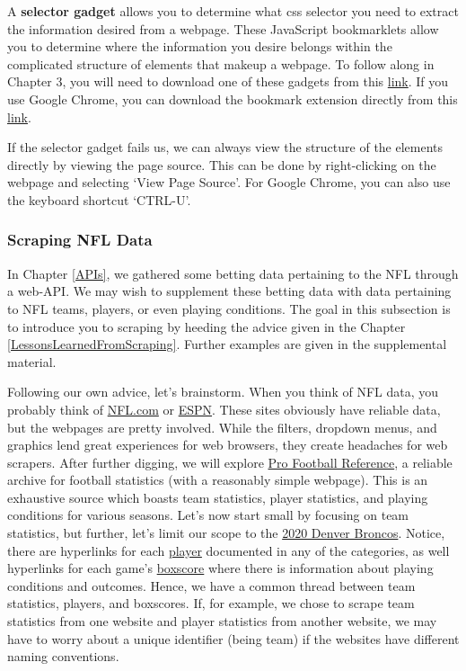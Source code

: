 \documentclass[
]{article}
\begin{document}
A \textbf{selector gadget} allows you to determine what css selector you need to extract the information desired from a webpage. These JavaScript bookmarklets allow you to determine where the information you desire belongs within the complicated structure of elements that makeup a webpage. To follow along in Chapter 3, you will need to download one of these gadgets from this \href{https://selectorgadget.com/}{link}. If you use Google Chrome, you can download the bookmark extension directly from this \href{https://selectorgadget.com/}{link}.

If the selector gadget fails us, we can always view the structure of the elements directly by viewing the page source. This can be done by right-clicking on the webpage and selecting `View Page Source'. For Google Chrome, you can also use the keyboard shortcut `CTRL-U'.

\hypertarget{scraping-nfl-data}{%
\subsubsection{Scraping NFL Data}\label{scraping-nfl-data}}

In Chapter \ref{APIs}, we gathered some betting data pertaining to the NFL through a web-API. We may wish to supplement these betting data with data pertaining to NFL teams, players, or even playing conditions. The goal in this subsection is to introduce you to scraping by heeding the advice given in the Chapter \ref{LessonsLearnedFromScraping}. Further examples are given in the supplemental material.

Following our own advice, let's brainstorm. When you think of NFL data, you probably think of \href{https://www.nfl.com/stats}{NFL.com} or \href{https://www.espn.com/nfl/stats}{ESPN}. These sites obviously have reliable data, but the webpages are pretty involved. While the filters, dropdown menus, and graphics lend great experiences for web browsers, they create headaches for web scrapers. After further digging, we will explore \href{https://www.pro-football-reference.com/}{Pro Football Reference}, a reliable archive for football statistics (with a reasonably simple webpage). This is an exhaustive source which boasts team statistics, player statistics, and playing conditions for various seasons. Let's now start small by focusing on team statistics, but further, let's limit our scope to the \href{https://www.pro-football-reference.com/teams/den/2020.htm}{2020 Denver Broncos}. Notice, there are hyperlinks for each \href{https://www.pro-football-reference.com/players/G/GordMe00.htm}{player} documented in any of the categories, as well hyperlinks for each game's \href{https://www.pro-football-reference.com/boxscores/202009140den.htm}{boxscore} where there is information about playing conditions and outcomes. Hence, we have a common thread between team statistics, players, and boxscores. If, for example, we chose to scrape team statistics from one website and player statistics from another website, we may have to worry about a unique identifier (being team) if the websites have different naming conventions.
\end{document}
